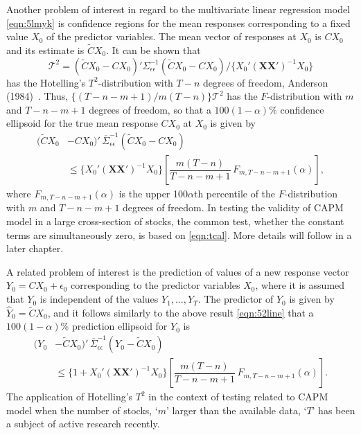 Another problem of interest in regard to the multivariate linear regression model \eqref{eqn:5lmyk} is confidence regions for the mean responses corresponding to a fixed value $X_0$ of the predictor variables. The mean vector of responses at $X_0$ is $CX_0$ and its estimate is $\tilde{C}X_0$. It can be shown that
	\begin{equation} \label{eqn:tcal}
	\mathcal{T}^2= ( \tilde{C }X_0 - CX_0)' \Sigma_{\epsilon\epsilon}^{-1} (\tilde{C} X_0 - CX_0) / \{X_0'(\mathbf{X} \mathbf{X}')^{-1}X_0 \}
	\end{equation}
has the Hotelling's $T^2$-distribution with $T - n$ degrees of freedom, Anderson (1984)~\cite[Chap. 5]{andersontw2}. Thus, $\{(T - n - m + 1)/ m(T - n)\} \mathcal{T}^2$ has the $F$-distribution with $m$ and $T - n - m + 1$ degrees of freedom, so that a $100(1 - \alpha)\%$ confidence ellipsoid for the true mean response $CX_0$ at $X_0$ is given by 
	\begin{equation} \label{eqn:52line}
	\begin{aligned}
	(\tilde{C}X_0 & -CX_0)' \, \overline{\Sigma}_{\epsilon\epsilon}^{-1} (\tilde{C}X_0 - CX_0) \\
	&\leq \{X_0' (\mathbf{X}\mathbf{X}')^{-1} X_0\} \left[ \dfrac{m(T - n)}{T - n - m + 1}\, F_{m,T - n - m + 1}(\alpha) \right],
	 \end{aligned}
	\end{equation}
where $F_{m,T - n - m + 1}(\alpha)$ is the upper 100$\alpha$th percentile of the $F$-distribution with $m$ and $T - n - m + 1$ degrees of freedom. In testing the validity of CAPM model in a large cross-section of stocks, the common test, whether the constant terms are simultaneously zero, is based on \eqref{eqn:tcal}. More details will follow in a later chapter.


A related problem of interest is the prediction of values of a new response vector $Y_0= CX_0 + \epsilon_0$ corresponding to the predictor variables $X_0$, where it is assumed that $Y_0$ is independent of the values $Y_1, \ldots, Y_T$. The predictor of $Y_0$ is given by $\hat{Y}_0= \tilde{C}X_0$, and it follows similarly to the above result \eqref{eqn:52line} that a $100(1 - \alpha)\%$ prediction ellipsoid for $Y_0$ is
	\begin{equation} \label{eqn:52another2}
	\begin{aligned}
	(Y_0 & -\tilde{C}X_0)' \, \overline{\Sigma}_{\epsilon\epsilon}^{-1} (Y_0 - \tilde{C} X_0) \\
	&\leq \{1 + X_0'(\mathbf{X}\mathbf{X}')^{-1} X_0\} \left[ \dfrac{m(T - n)}{T - n - m + 1} \, F_{m,T - n - m + 1}(\alpha) \right].
	\end{aligned}
	\end{equation}
The application of Hotelling's $T^2$ in the context of testing related to CAPM model when the number of stocks, `$m$' larger than the available data, `$T$' has been a subject of active research recently. \label{in:multreg2}



